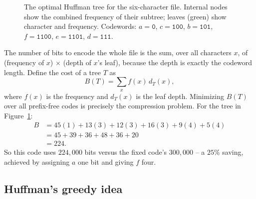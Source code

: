 \begin{figure}[h]
\centering
{}
\caption{The optimal Huffman tree for the six-character file. Internal nodes show
the combined frequency of their subtree; leaves (green) show character and
frequency. Codewords: $a=\texttt{0}$, $c=\texttt{100}$, $b=\texttt{101}$,
$f=\texttt{1100}$, $e=\texttt{1101}$, $d=\texttt{111}$.}
\label{ch16:huffman-tree}
\end{figure}

The number of bits to encode the whole file is the sum, over all characters $x$,
of (frequency of $x$) $\times$ (depth of $x$'s leaf), because the depth is
exactly the codeword length. Define the cost of a tree $T$ as
\[
  B(T) = \sum_{x} f(x)\, d_T(x),
\]
where $f(x)$ is the frequency and $d_T(x)$ is the leaf depth. Minimizing $B(T)$
over all prefix-free codes is precisely the compression problem. For the tree in
Figure~\ref{ch16:huffman-tree}:
\begin{align*}
  B &= 45(1) + 13(3) + 12(3) + 16(3) + 9(4) + 5(4) \\
    &= 45 + 39 + 36 + 48 + 36 + 20 \\
    &= 224.
\end{align*}
So this code uses $224{,}000$ bits versus the fixed code's $300{,}000$ -- a
$25\%$ saving, achieved by assigning $a$ one bit and giving $f$ four.

\subsection{Huffman's greedy idea}

